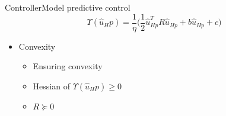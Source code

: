 \begin{frame}{Controller}{Model predictive control}
\begin{equation}
	\Upsilon(\hat{u}_Hp) = \frac{1}{\eta}\bigg( \frac{1}{2} \hat{u}_{{Hp}}^{T} R \hat{u}_{Hp} + b \hat{u}_{Hp} + c \bigg)
\end{equation}
\begin{itemize}
	\item<1-> Convexity 
	 	\begin{itemize}
	 	\item<1-> Ensuring convexity 
	 	\item<1-> Hessian of $\Upsilon(\hat{u}_Hp) \ge 0$ 
	 	\item<1-> $R \succeq 0$
	 	\end{itemize}
\end{itemize}
\end{frame}